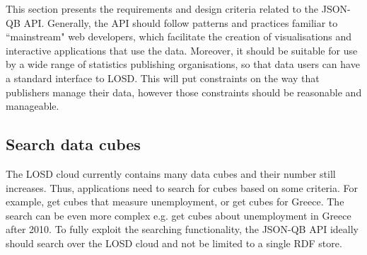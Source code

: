 \documentclass{llncs}
\begin{document}
This section presents the requirements and design criteria related to the JSON-QB API. Generally, the API should follow patterns and practices familiar to ``mainstream" web developers, which facilitate the creation of visualisations and interactive applications that use the data. Moreover, it should be suitable for use by a wide range of statistics publishing organisations, so that data users can have a standard interface to LOSD. This will put constraints on the way that publishers manage their data, however those constraints should be reasonable and manageable. 
%

\subsection{Search data cubes}\label{sec:search}

The LOSD cloud currently contains many data cubes and their number still increases. Thus, applications need to search for cubes based on some criteria. For example, get cubes that measure unemployment, or get cubes for Greece. The search can be even more complex e.g. get cubes about unemployment in Greece after 2010. To fully exploit the searching functionality, the JSON-QB API ideally should search over the LOSD cloud and not be limited to a single RDF store.
\end{document}
